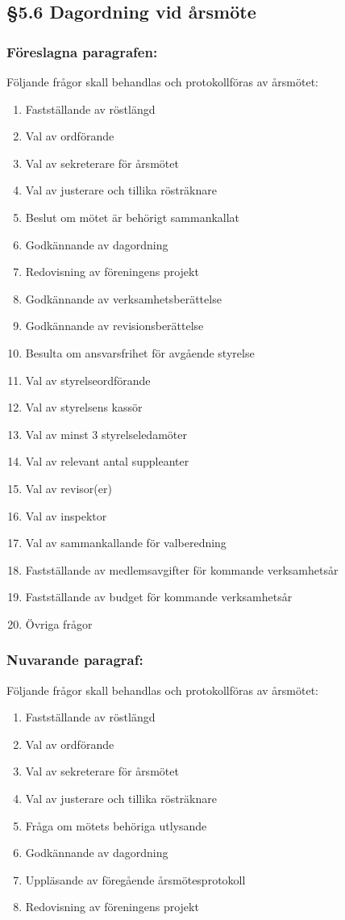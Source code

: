 \documentclass[11pt,a4paper]{article}
\newcommand{\change}[3]{\subsection*{#1}
  \subsubsection*{Föreslagna paragrafen:}
  #2
  \subsubsection*{Nuvarande paragraf:}
  #3}
\begin{document}
\change{§5.6 Dagordning vid årsmöte}{
Följande frågor skall behandlas och protokollföras av årsmötet:
\begin{enumerate}
\item Fastställande av röstlängd
\item Val av ordförande
\item Val av sekreterare för årsmötet
\item Val av justerare och tillika rösträknare
\item Beslut om mötet är behörigt sammankallat
\item Godkännande av dagordning
\item Redovisning av föreningens projekt
\item Godkännande av verksamhetsberättelse
\item Godkännande av revisionsberättelse
\item Besulta om ansvarsfrihet för avgående styrelse
\item Val av styrelseordförande
\item Val av styrelsens kassör
\item Val av minst 3 styrelseledamöter
\item Val av relevant antal suppleanter
\item Val av revisor(er)
\item Val av inspektor
\item Val av sammankallande för valberedning
\item Fastställande av medlemsavgifter för kommande verksamhetsår
\item Fastställande av budget för kommande verksamhetsår
\item Övriga frågor
\end{enumerate}}{
Följande frågor skall behandlas och protokollföras av årsmötet:
\begin{enumerate}
\item Fastställande av röstlängd
\item Val av ordförande
\item Val av sekreterare för årsmötet
\item Val av justerare och tillika rösträknare
\item Fråga om mötets behöriga utlysande
\item Godkännande av dagordning
\item Uppläsande av föregående årsmötes{}protokoll%
\item Redovisning av föreningens projekt

\end{enumerate}}
\end{document}
